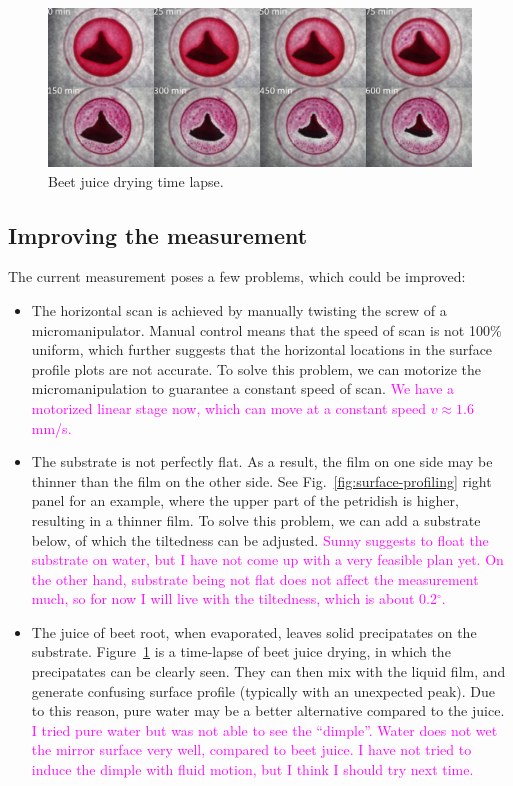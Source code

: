 \documentclass[12pt]{article}
\begin{document}
\begin{figure}
    \centering
    \includegraphics[width=\textwidth]{Figures/beet-juice-drying-timelapse.pdf}
    \caption{Beet juice drying time lapse.}
    \label{fig:beet-juice-drying-timelapse}
\end{figure}

\subsection{Improving the measurement}

The current measurement poses a few problems, which could be improved:
\begin{itemize}
    \item The horizontal scan is achieved by manually twisting the screw of a micromanipulator. Manual control means that the speed of scan is not 100\% uniform, which further suggests that the horizontal locations in the surface profile plots are not accurate. To solve this problem, we can motorize the micromanipulation to guarantee a constant speed of scan. \textcolor{magenta}{We have a motorized linear stage now, which can move at a constant speed $v\approx 1.6$ mm/s.}
    \item The substrate is not perfectly flat. As a result, the film on one side may be thinner than the film on the other side. See Fig.~\ref{fig:surface-profiling} right panel for an example, where the upper part of the petridish is higher, resulting in a thinner film. To solve this problem, we can add a substrate below, of which the tiltedness can be adjusted. \textcolor{magenta}{Sunny suggests to float the substrate on water, but I have not come up with a very feasible plan yet. On the other hand, substrate being not flat does not affect the measurement much, so for now I will live with the tiltedness, which is about 0.2$^\circ$.}
    \item The juice of beet root, when evaporated, leaves solid precipatates on the substrate. Figure~\ref{fig:beet-juice-drying-timelapse} is a time-lapse of beet juice drying, in which the precipatates can be clearly seen. They can then mix with the liquid film, and generate confusing surface profile (typically with an unexpected peak). Due to this reason, pure water may be a better alternative compared to the juice. \textcolor{magenta}{I tried pure water but was not able to see the ``dimple''. Water does not wet the mirror surface very well, compared to beet juice. I have not tried to induce the dimple with fluid motion, but I think I should try next time.}
\end{itemize}
\end{document}
